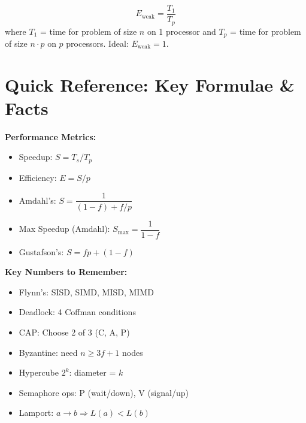 \documentclass[11pt,a4paper]{article}
\begin{document}
\begin{formulabox}
\[
E_{\text{weak}} = \frac{T_1}{T_p}
\]
where $T_1$ = time for problem of size $n$ on 1 processor and $T_p$ = time for problem of size $n \cdot p$ on $p$ processors. Ideal: $E_{\text{weak}} = 1$.
\end{formulabox}

\section{Quick Reference: Key Formulae \& Facts}

\begin{center}
\begin{tcolorbox}[
  enhanced, colback=primary!5, colframe=primary,
  boxrule=1pt, arc=4pt, width=\textwidth,
  title={\faIcon{star}~Exam Formula \& Fact Sheet}, fonttitle=\bfseries\large,
  colbacktitle=primary, coltitle=white
]
\begin{multicols}{2}
\textbf{\textcolor{primary}{Performance Metrics:}}
\begin{itemize}[leftmargin=*, itemsep=2pt]
  \item Speedup: $S = T_s / T_p$
  \item Efficiency: $E = S/p$
  \item Amdahl's: $S = \dfrac{1}{(1-f)+f/p}$
  \item Max Speedup (Amdahl): $S_{\max} = \dfrac{1}{1-f}$
  \item Gustafson's: $S = fp + (1-f)$
\end{itemize}

\columnbreak

\textbf{\textcolor{primary}{Key Numbers to Remember:}}
\begin{itemize}[leftmargin=*, itemsep=2pt]
  \item Flynn's: SISD, SIMD, MISD, MIMD
  \item Deadlock: 4 Coffman conditions
  \item CAP: Choose 2 of 3 (C, A, P)
  \item Byzantine: need $n \geq 3f+1$ nodes
  \item Hypercube $2^k$: diameter = $k$
  \item Semaphore ops: P (wait/down), V (signal/up)
  \item Lamport: $a \to b \Rightarrow L(a) < L(b)$
\end{itemize}
\end{multicols}
\end{tcolorbox}
\end{center}
\end{document}
